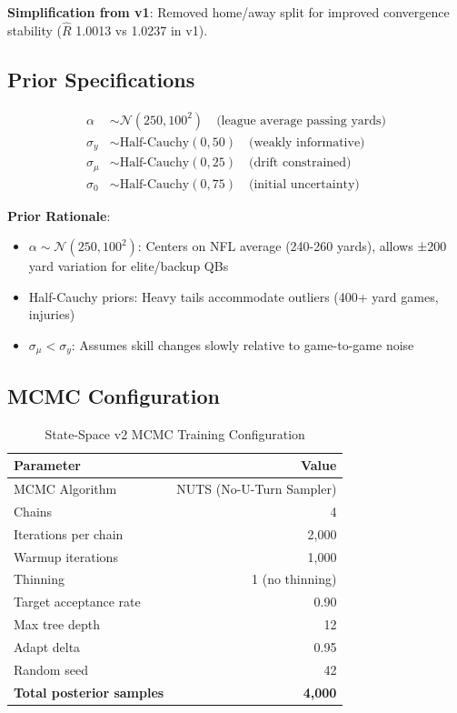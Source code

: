 \textbf{Simplification from v1}: Removed home/away split for improved convergence stability ($\hat{R}$ 1.0013 vs 1.0237 in v1).

\subsection{Prior Specifications}

\begin{align}
\alpha &\sim \mathcal{N}(250, 100^2) \quad \text{(league average passing yards)} \\
\sigma_y &\sim \text{Half-Cauchy}(0, 50) \quad \text{(weakly informative)} \\
\sigma_\mu &\sim \text{Half-Cauchy}(0, 25) \quad \text{(drift constrained)} \\
\sigma_0 &\sim \text{Half-Cauchy}(0, 75) \quad \text{(initial uncertainty)}
\label{eq:state-space-priors}
\end{align}

\textbf{Prior Rationale}:
\begin{itemize}
\item $\alpha \sim \mathcal{N}(250, 100^2)$: Centers on NFL average (240-260 yards), allows ±200 yard variation for elite/backup QBs
\item Half-Cauchy priors: Heavy tails accommodate outliers (400+ yard games, injuries)
\item $\sigma_\mu < \sigma_y$: Assumes skill changes slowly relative to game-to-game noise
\end{itemize}

\subsection{MCMC Configuration}

\begin{table}[h]
\centering
\caption{State-Space v2 MCMC Training Configuration}
\label{tab:state-space-mcmc}
\begin{tabular}{lr}
\toprule
\textbf{Parameter} & \textbf{Value} \\
\midrule
MCMC Algorithm & NUTS (No-U-Turn Sampler) \\
Chains & 4 \\
Iterations per chain & 2,000 \\
Warmup iterations & 1,000 \\
Thinning & 1 (no thinning) \\
Target acceptance rate & 0.90 \\
Max tree depth & 12 \\
Adapt delta & 0.95 \\
Random seed & 42 \\
\midrule
\textbf{Total posterior samples} & \textbf{4,000} \\
\bottomrule
\end{tabular}
\end{table}

